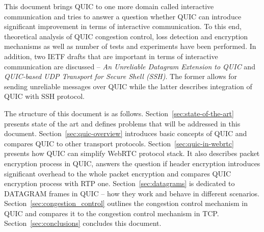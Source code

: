 This document brings QUIC to one more domain called interactive communication and tries to answer a question whether QUIC can introduce significant improvement in terms of interactive communication.
To this end, theoretical analysis of QUIC congestion control, loss detection and encryption mechanisms as well as number of tests and experiments have been performed.
In addition, two IETF drafts that are important in terms of interactive communication are discussed -- \textit{An Unreliable Datagram Extension to QUIC} and \textit{QUIC-based UDP Transport for Secure Shell (SSH)}.
The former allows for sending unreliable messages over QUIC while the latter describes integration of QUIC with SSH protocol.

The structure of this document is as follows.
Section~\ref{sec:state-of-the-art} presents state of the art and defines problems that will be addressed in this document.
Section~\ref{sec:quic-overview} introduces basic concepts of QUIC and compares QUIC to other transport protocols.
Section~\ref{sec:quic-in-webrtc} presents how QUIC can simplify WebRTC protocol stack.
It also describes packet encryption process in QUIC, answers the question if header encryption introduces significant overhead to the whole packet encryption and compares QUIC encryption process with RTP one.
Section~\ref{sec:datagrams} is dedicated to DATAGRAM frames in QUIC -- how they work and behave in different scenarios.
Section~\ref{sec:congestion_control} outlines the congestion control mechanism in QUIC and compares it to the congestion control mechanism in TCP\@.
Section~\ref{sec:conclusions} concludes this document.
